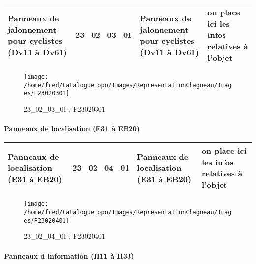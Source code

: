 \documentclass[12pt,titlepage,oneside]{book}
\begin{document}
\renewcommand{\arraystretch}{1.2}
\begin{supertabular}{|p{10cm}|c|p{13cm}|p{12cm}|}
 Panneaux de jalonnement pour cyclistes (Dv11 à Dv61) & 23\_02\_03\_01 & Panneaux de jalonnement pour cyclistes (Dv11 à Dv61) & on place ici les infos relatives à l'objet\\
\hline
\end{supertabular}
\begin{figure}[h!]
  \hfill         %
  \begin{minipage}[t]{3cm}
    \begin{center}
      \texttt{[image: /home/fred/CatalogueTopo/Images/RepresentationChagneau/Images/F23020301]}
      \caption[F23020301]{\label{} 23\_02\_03\_01 : F23020301}
    \end{center}
  \end{minipage}
\end{figure}


\paragraph{Panneaux de localisation (E31 à EB20)}
\noindent
\vspace{\baselineskip}

\renewcommand{\arraystretch}{1.2}
\begin{supertabular}{|p{10cm}|c|p{13cm}|p{12cm}|}
 Panneaux de localisation (E31 à EB20) & 23\_02\_04\_01 & Panneaux de localisation (E31 à EB20) & on place ici les infos relatives à l'objet\\
\hline
\end{supertabular}
\begin{figure}[h!]
  \hfill         %
  \begin{minipage}[t]{3cm}
    \begin{center}
      \texttt{[image: /home/fred/CatalogueTopo/Images/RepresentationChagneau/Images/F23020401]}
      \caption[F23020401]{\label{} 23\_02\_04\_01 : F23020401}
    \end{center}
  \end{minipage}
\end{figure}


\paragraph{Panneaux d information (H11 à H33)}
\noindent
\vspace{\baselineskip}
\end{document}
